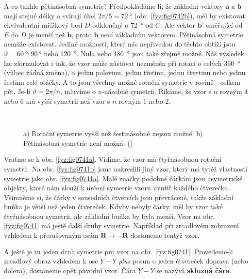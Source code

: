     A co takhle pětinásobná symetrie? Předpokládáme-li, že základní vektory \(\bm{a}\) a \(\bm{b}\) 
    mají stejné délky a svírají úhel \(2\pi /5 = \qty{72}{\degree}\) (obr. \ref{fyz:fig0742b}), měl 
    by existovat ekvivalentní mřížkový bod \(D\) odkloněný o \qty{72}{\degree} od \(C\). Ale vektor 
    \(\bm{b'}\) směřující od \(E\) do \(D\) je menší než \(\bm{b}\), proto \(\bm{b}\) není 
    základním vektorem. Pětinásobná symetrie nemůže existovat. Jediné možnosti, které nás 
    nepřivedou do těchto obtíží jsou \(\vartheta = \qty{60}{\degree}; \qty{90}{\degree}\) nebo 
    \qty{120}{\degree}. Nula nebo \qty{180}{\degree} jsou také zřejmě možné. Náš výsledek lze 
    zformulovat i tak, že vzor může zůstávat nezměněn při rotaci o celých \qty{360}{\degree} (vůbec 
    žádná změna), o jednu polovinu, jednu třetinu, jednu čtvrtinu nebo jednu šestinu celé otáčky. A 
    to jsou všechny možné rotační symetrie v rovině - celkem pět. Je-li \(\vartheta = 2\pi/n\), 
    mluvíme o \(n\)-násobné symetrii. Říkáme, že vzor s \(n\) rovným \(4\) nebo \(6\) má vyšší 
    symetrii než vzor s \(n\) rovným \(1\) nebo \(2\). 

    \begin{figure}[ht!]    %
      \centering
                     \\
      \caption{a) Rotační symetrie vyšší než šestinásobné nejsou možné. b) Pětinásobná symetrie 
               není možná.
               (\cite[s.~550]{Feynman02})}
      \label{fyz:fig0742}
    \end{figure}

    Vraťme se k obr. \ref{fyz:fig0741a}. Vidíme, že vzor má čtyřnásobnou rotační symetrii. Na obr. 
    \ref{fyz:fig0741b} jsme nakreslili jiný vzor, který má tytéž vlastnosti symetrie jako obr. 
    \ref{fyz:fig0741a}. Malé značky podobné čárkám jsou asymetrické objekty, které nám slouží k 
    určení symetrie vzoru uvnitř každého čtverečku. Všimněme si, že čárky v sousedních čtvercích 
    jsou převrácené, takže základní buňka je větší než jeden čtvereček. Kdyby nebyly čárky, měl by 
    vzor také čtyřnásobnou symetrii, ale základní buňka by byla menší. Vzor na obr. 
    \ref{fyz:fig0741} má ještě další druhy symetrie. Například při zrcadlovém zobrazení vzhledem k 
    přerušovaným osám \(\bm{R} \rightarrow \bm{-R}\) dostaneme tentýž vzor. 

    A ještě je tu jeden druh symetrie pro vzor na obr. \ref{fyz:fig0741}. Provedeme-li zrcadlový 
    obraz vzhledem k ose \(Y-Y\) \emph{plus} posun o jeden čtvereček doprava (nebo doleva), 
    dostaneme opět původní vzor. Čára \(Y-Y\) se nazývá \textbf{skluzná čára}.

